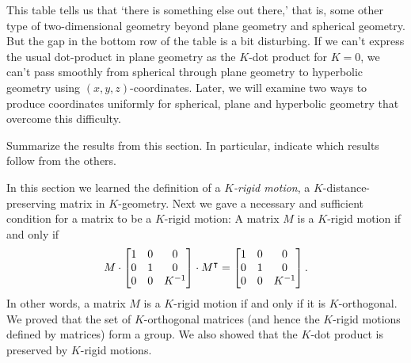 \documentclass[newpage,hints,handout,noauthor,nooutcomes,12pt]{ximera}
\begin{document}
This table tells us that `there is something else out there,' that is,
some other type of two-dimensional geometry beyond plane geometry and
spherical geometry. But the gap in the bottom row of the table is a
bit disturbing. If we can't express the usual dot-product in plane
geometry as the $K$-dot product for $K=0$, we can't pass smoothly from
spherical through plane geometry to hyperbolic geometry using
$(x,y,z)$-coordinates. Later, we will examine two ways to produce coordinates
uniformly for spherical, plane and hyperbolic geometry that overcome
this difficulty. 



\begin{problem}
Summarize the results from this section. In particular, indicate which
results follow from the others.
\begin{freeResponse}
In this section we learned the definition of a \textit{$K$-rigid
  motion}, a $K$-distance-preserving matrix in $K$-geometry. Next we
gave a necessary and sufficient condition for a matrix to be a
$K$-rigid motion: A matrix $M$ is a $K$-rigid motion if and only if
\[
M\cdot\begin{bmatrix}
1 & 0 & 0\\
0 & 1 & 0\\
0 & 0 & K^{-1}%
\end{bmatrix}  \cdot M^\transpose=\begin{bmatrix}
1 & 0 & 0\\
0 & 1 & 0\\
0 & 0 & K^{-1}%
\end{bmatrix}.
\]
In other words, a matrix $M$ is a $K$-rigid motion if and only if it is $K$-orthogonal.
We proved that the set of $K$-orthogonal matrices (and hence the $K$-rigid motions defined by matrices) form a group. 
We also showed that the $K$-dot product is preserved by $K$-rigid motions.
\end{freeResponse}
\end{problem}
\end{document}
